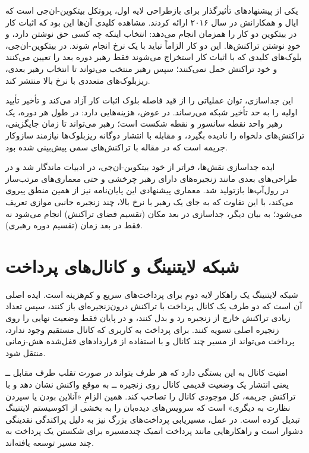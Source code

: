 یکی از پیشنهادهای تأثیرگذار برای بازطراحی لایه اول، پروتکل بیتکوین-ان‌جی است که ایال و همکارانش در سال ۲۰۱۶ ارائه کردند. مشاهده کلیدی آن‌ها این بود که اثبات کار در بیتکوین دو کار را همزمان انجام می‌دهد: انتخاب اینکه چه کسی حق نوشتن دارد، و خودِ نوشتن تراکنش‌ها. این دو کار الزاماً نباید با یک نرخ انجام شوند. در بیتکوین-ان‌جی، بلوک‌های کلیدی که با اثبات کار استخراج می‌شوند فقط رهبر دوره بعد را تعیین می‌کنند و خود تراکنش حمل نمی‌کنند؛ سپس رهبر منتخب می‌تواند تا انتخاب رهبر بعدی، ریزبلوک‌های متعددی با نرخ بالا منتشر کند.

این جداسازی، توان عملیاتی را از قید فاصله بلوک اثبات کار آزاد می‌کند و تأخیر تأیید اولیه را به حد تأخیر شبکه می‌رساند. در عوض، هزینه‌هایی دارد: در طول هر دوره، یک رهبر واحد نقطه سانسور و نقطه شکست است؛ رهبر می‌تواند تا زمان جایگزینی، تراکنش‌های دلخواه را نادیده بگیرد، و مقابله با انتشار دوگانه ریزبلوک‌ها نیازمند سازوکار جریمه است که در مقاله با تراکنش‌های سمی پیش‌بینی شده بود.

ایده جداسازی نقش‌ها، فراتر از خود بیتکوین-ان‌جی، در ادبیات ماندگار شد و در طراحی‌های بعدی مانند زنجیره‌های دارای رهبر چرخشی و حتی معماری‌های مرتب‌ساز در رول‌آپ‌ها بازتولید شد. معماری پیشنهادی این پایان‌نامه نیز از همین منطق پیروی می‌کند، با این تفاوت که به جای یک رهبر با نرخ بالا، چند زنجیره جانبی موازی تعریف می‌شود؛ به بیان دیگر، جداسازی در بعد مکان (تقسیم فضای تراکنش) انجام می‌شود نه فقط در بعد زمان (تقسیم دوره رهبری).

\section{شبکه لایتنینگ و کانال‌های پرداخت}

شبکه لایتنینگ یک راهکار لایه دوم برای پرداخت‌های سریع و کم‌هزینه است. ایده اصلی آن است که دو طرف یک کانال پرداخت با تراکنش درون‌زنجیره‌ای باز کنند، سپس تعداد زیادی تراکنش خارج از زنجیره رد و بدل کنند، و در پایان فقط وضعیت نهایی را روی زنجیره اصلی تسویه کنند. برای پرداخت به کاربری که کانال مستقیم وجود ندارد، پرداخت می‌تواند از مسیر چند کانال و با استفاده از قراردادهای قفل‌شده هش-زمانی منتقل شود.

امنیت کانال به این بستگی دارد که هر طرف بتواند در صورت تقلب طرف مقابل ــ یعنی انتشار یک وضعیت قدیمی کانال روی زنجیره ــ به موقع واکنش نشان دهد و با تراکنش جریمه، کل موجودی کانال را تصاحب کند. همین الزامِ «آنلاین بودن یا سپردن نظارت به دیگری» است که سرویس‌های دیده‌بان را به بخشی از اکوسیستم لایتنینگ تبدیل کرده است. در عمل، مسیریابی پرداخت‌های بزرگ نیز به دلیل پراکندگی نقدینگی دشوار است و راهکارهایی مانند پرداخت اتمیک چندمسیره برای شکستن یک پرداخت به چند مسیر توسعه یافته‌اند.

